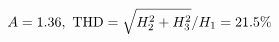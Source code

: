 \documentclass[preview]{standalone}
\begin{document}
\begin{align*}
\special{dvisvgm:raw <g id='unique000'>}A=1.36,\ \text{THD}=\sqrt{H_2^2+H_3^2}/H_1=21.5\%\special{dvisvgm:raw </g>}
\end{align*}
\end{document}

